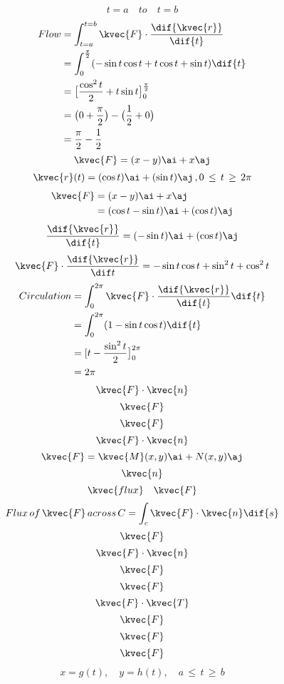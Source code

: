 %
%
\begin{align*}
t=a \quad to\quad t=b
\end{align*}
\begin{align*}
Flow&= \int_{t=a}^{t=b} \kvec{F} \cdot \frac{\dif{\kvec {r}}}{\dif{t}}\\
&=\int_{0}^{\frac{\pi}{2}} (-\sin t \cos t +t\cos t+ \sin t)\dif{t} \\
&= \big[\frac {\cos ^{2}t}{2} + t \sin t \big]_{0}^{\frac{\pi}{2}}\\
&=\big(0 + \frac{\pi}{2} \big) -\big( \frac{1}{2} +0 \big) \\
&=\frac{\pi}{2}- \frac{1}{2}
\end{align*}
\[ \kvec {F} = (x-y)\ai + x\aj \]
\begin{align*}
\kvec {r}(t)= (\cos t)\ai +(\sin t)\aj \, , 0\, \le\, t \, \ge \, 2\pi
\end{align*}
\begin{align*}
\kvec{F}&=(x-y)\ai +x\aj \\
&=(\cos t - \sin t)\ai + (\cos t)\aj
\end{align*}
\begin{align*}
\frac{\dif{\kvec{r}}}{\dif {t}} = (- \sin t)\ai + (\cos t)\aj
\end{align*}
\begin{align*}
\kvec{F}\cdot \frac{\dif{\kvec{r}}}{\dif t} = -\sin t \cos t + \sin ^{2} t+\cos ^{2} t
\end{align*}
\begin{align*}
Circulation&=\int_{0}^{2\pi} \kvec{F} \cdot \frac{\dif{\kvec {r}}}{\dif{t}} \dif{t} \\
&=\int_{0}^{2\pi} (1-\sin t \cos t)\dif{t}\\
&=[t - \frac{\sin ^{2}t}{2} \big ]_{0}^{2 \pi} \\
&=2 \pi 
\end{align*}
\[ \kvec{F} \cdot \kvec{n} \]
\[ \kvec{F} \]
\[ \kvec{F} \]
\[ \kvec{F} \cdot \kvec{n} \]
\[ \kvec{F} = \kvec {M} (x,y)\ai + N(x,y)\aj   \]
\[ \kvec{n}    \]
\[ \kvec{flux} \quad \kvec{F}\]
\[ Flux\,  of \, \kvec{F} \, across\,  C = \int_{c} \kvec{F} \cdot \kvec{n} \dif{s}\]
\[\kvec{F}\]
\[ \kvec {F} \cdot \kvec {n}\]
\[\kvec{F}\]
\[\kvec{F}\]
\[ \kvec {F} \cdot \kvec {T}\]
\[\kvec{F}\]
\[\kvec{F}\]
\[\kvec{F}\]
\begin{align*}
x=g(t)   ,\quad y=h(t) ,\quad a\, \le \, t \, \ge \, b  
\end{align*}
